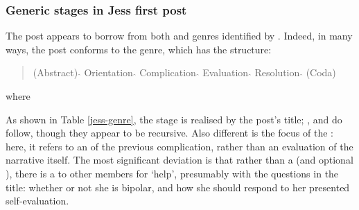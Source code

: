 \subsubsection{Generic stages in Jess first post}

The \gls{post} appears to borrow from both  and  genres identified by \textcite{labov_narrative_1997}. Indeed, in many ways, the \gls{post} conforms to the  genre, which has the structure:

\begin{quote}
(Abstract) $\hat{}$ Orientation $\hat{}$ Complication $\hat{}$ Evaluation $\hat{}$ Resolution $\hat{}$ (Coda)
\end{quote}

\noindent where

\begin{itemize}
\end{itemize}
%
As shown in Table \ref{jess-genre}, the  stage is realised by the \gls{post}'s title; ,  and  do follow, though they appear to be recursive. Also different is the focus of the : here, it refers to an  of the previous complication, rather than an evaluation of the narrative itself. The most significant deviation is that rather than a  (and optional ), there is a  to other members for `help', presumably with the questions  in the title: whether or not she is bipolar, and how she should respond to her presented self\hyp{}evaluation.

